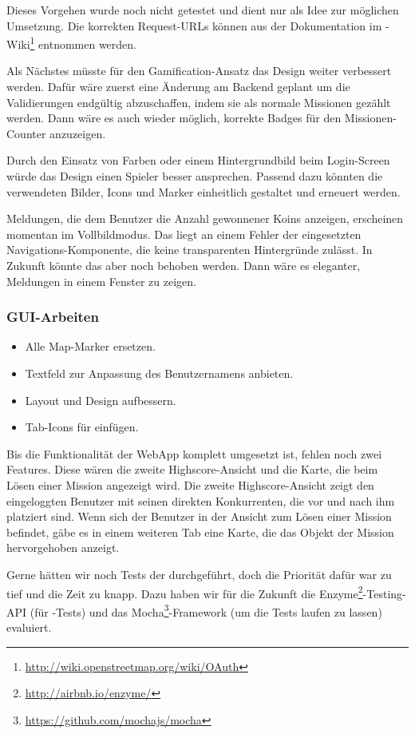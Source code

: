 Dieses Vorgehen wurde noch nicht getestet und dient nur als Idee zur möglichen Umsetzung.
Die korrekten Request-URLs können aus der Dokumentation im -Wiki\footnote{\url{http://wiki.openstreetmap.org/wiki/OAuth}} entnommen werden.

Als Nächstes müsste für den \gls{Gamification}-Ansatz das Design weiter verbessert werden. 
Dafür wäre zuerst eine Änderung am Backend geplant um die Validierungen endgültig abzuschaffen, indem sie als normale Missionen gezählt werden. 
Dann wäre es auch wieder möglich, korrekte Badges für den Missionen-Counter anzuzeigen. 

Durch den Einsatz von Farben oder einem Hintergrundbild beim Login-Screen würde das Design einen Spieler besser ansprechen. 
Passend dazu könnten die verwendeten Bilder, Icons und Marker einheitlich gestaltet und erneuert werden. 

Meldungen, die dem Benutzer die Anzahl gewonnener Koins anzeigen, erscheinen momentan im Vollbildmodus. 
Das liegt an einem Fehler der eingesetzten Navigations-Komponente, die keine transparenten Hintergründe zulässt. 
In Zukunft könnte das aber noch behoben werden. 
Dann wäre es eleganter, Meldungen in einem Fenster zu zeigen.

\subsubsection{GUI-Arbeiten}
\begin{itemize}
	\item Alle Map-Marker ersetzen.
	\item Textfeld zur Anpassung des Benutzernamens anbieten.
	\item Layout und Design aufbessern.
	\item Tab-Icons für  einfügen.
\end{itemize}

Bis die Funktionalität der \gls{WebApp} komplett umgesetzt ist, fehlen noch zwei Features. 
Diese wären die zweite Highscore-Ansicht und die Karte, die beim Lösen einer Mission angezeigt wird. 
Die zweite Highscore-Ansicht zeigt den eingeloggten Benutzer mit seinen direkten Konkurrenten, die vor und nach ihm platziert sind. 
Wenn sich der Benutzer in der Ansicht zum Lösen einer Mission befindet, gäbe es in einem weiteren Tab eine Karte, die das Objekt der Mission hervorgehoben anzeigt. 

Gerne hätten wir noch Tests der  durchgeführt, doch die Priorität dafür war zu tief und die Zeit zu knapp. 
Dazu haben wir für die Zukunft die Enzyme\footnote{\url{http://airbnb.io/enzyme/}}-Testing-API (für -Tests) und das Mocha\footnote{\url{https://github.com/mochajs/mocha}}-\gls{Framework} (um die Tests laufen zu lassen) evaluiert.

